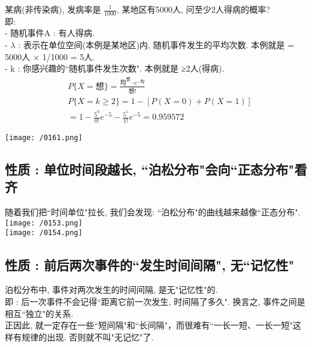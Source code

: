 \documentclass[UTF8]{ctexart}
\begin{document}
	
	
	
	\begin{myEnvSample}
		某病(非传染病), 发病率是 $\frac{1} {1000}$, 某地区有5000人, 问至少2人得病的概率? \\
		即: \\
		- 随机事件A : 有人得病. \\
		- $\lambda$ : 表示在单位空间(本例是某地区)内, 随机事件发生的平均次数. 本例就是 = 5000人 × 1/1000 = 5人. \\
		- k : 你感兴趣的``随机事件发生次数". 本例就是 ≥2人(得病).  		
		\begin{align*}  %
	&P\{X=\text{想\}}=\frac{\text{均}^{\text{想}}\cdot e^{-\text{均}}}{\text{想!}}\\
&P\{X=k\ge 2\}=1-\left[ P\left( X=0 \right) +P\left( X=1 \right) \right]\\
&=1-\frac{5^0}{0!}e^{-5}-\frac{5^1}{1!}e^{-5}=0.959572
		\end{align*}
	
	\texttt{[image: /0161.png]}
		
	\end{myEnvSample}
	
	
	
	
	
	\subsection{性质 : 单位时间段越长, ``泊松分布"会向``正态分布"看齐 }
	
	随着我们把``时间单位"拉长, 我们会发现: ``泊松分布"的曲线越来越像``正态分布". \\
	
		\texttt{[image: /0153.png]} \\	
		\texttt{[image: /0154.png]} \\	
	
	
	
	\subsection{性质 : 前后两次事件的``发生时间间隔", 无``记忆性"}
	
	泊松分布中, 事件对两次发生的时间间隔, 是无"记忆性"的. \\
	即 : 后一次事件不会记得``距离它前一次发生, 时间隔了多久". 换言之, 事件之间是相互``独立"的关系. \\
	正因此, 就一定存在一些``短间隔"和``长间隔"，而很难有``一长一短、一长一短"这样有规律的出现. 否则就不叫"无记忆"了. 
	
\end{document}
